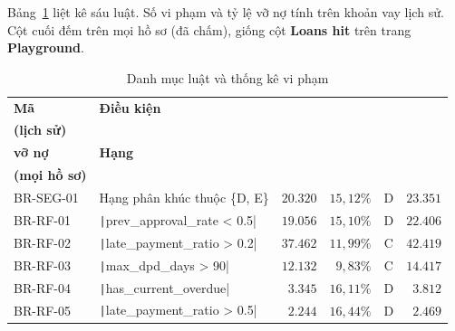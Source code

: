 Bảng~\ref{tab:business-rules} liệt kê sáu luật. Số vi phạm và tỷ lệ vỡ nợ tính trên khoản vay lịch sử. Cột cuối đếm trên mọi hồ sơ (đã chấm), giống cột \textbf{Loans hit} trên trang \textbf{Playground}.

\begin{table}[H]
	\centering
	\caption{Danh mục luật và thống kê vi phạm}
	\label{tab:business-rules}
	\footnotesize
	\begin{tabular}{l p{} r r c r}
		\toprule
		\textbf{Mã} & \textbf{Điều kiện}                                                 & \makecell[r]{\textbf{Vi phạm}\\\textbf{(lịch sử)}} & \makecell[r]{\textbf{Tỷ lệ}\\\textbf{vỡ nợ}} & \textbf{Hạng} & \makecell[r]{\textbf{Vi phạm}\\\textbf{(mọi hồ sơ)}} \\
		\midrule
		BR-SEG-01   & Hạng phân khúc thuộc \{D, E\}                                      & $20.320$                                           & $15{,}12\%$                                  & D             & $23.351$                                             \\
		BR-RF-01    & \texttt|prev_approval_rate < 0.5| & $19.056$                                           & $15{,}10\%$                                  & D             & $22.406$                                             \\
		BR-RF-02    & \texttt|late_payment_ratio > 0.2| & $37.462$                                           & $11{,}99\%$                                  & C             & $42.419$                                             \\
		BR-RF-03    & \texttt|max_dpd_days > 90|        & $12.132$                                           & $9{,}83\%$                                   & C             & $14.417$                                             \\
		BR-RF-04    & \texttt|has_current_overdue|      & $3.345$                                            & $16{,}11\%$                                  & D             & $3.812$                                              \\
		BR-RF-05    & \texttt|late_payment_ratio > 0.5| & $2.244$                                            & $16{,}44\%$                                  & D             & $2.469$                                              \\
		\bottomrule
	\end{tabular}
\end{table}

